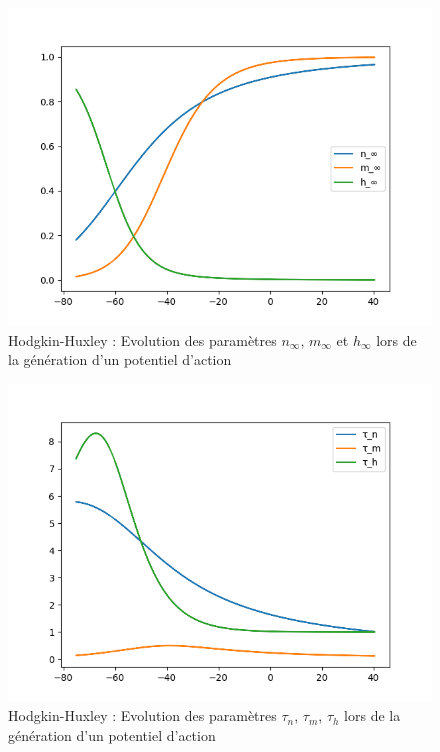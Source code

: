 \documentclass[12pt]{scrartcl}
\begin{document}
\begin{figure}[!h]
\centering
\includegraphics[scale=0.65]{imgs/hhinfty.png}
\caption{Hodgkin-Huxley : Evolution des paramètres $n_\infty$, $m_\infty$ et $h_\infty$ lors de la génération d'un potentiel d'action}
\label{hhinfty}
\end{figure}

\begin{figure}[!h]
\centering
\includegraphics[scale=0.65]{imgs/hhtime.png}
\caption{Hodgkin-Huxley : Evolution des paramètres $\tau_n$, $\tau_m$, $\tau_h$ lors de la génération d'un potentiel d'action}
\label{hhtime}
\end{figure}
\end{document}

